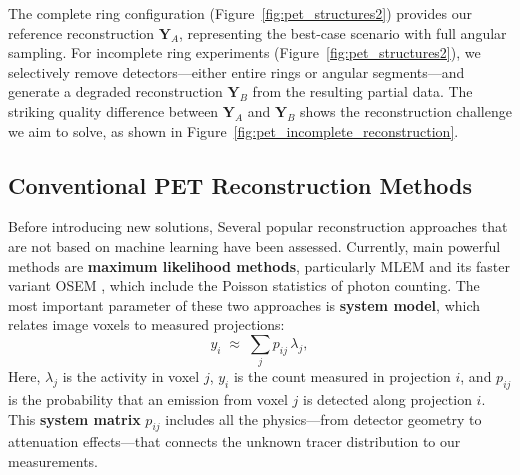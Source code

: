 \documentclass[12pt]{iopart}
\begin{document}
The complete ring configuration (Figure~\ref{fig:pet_structures2}) provides our reference reconstruction $\mathbf{Y}_A$, representing the best-case scenario with full angular sampling. For incomplete ring experiments (Figure~\ref{fig:pet_structures2}), we selectively remove detectors—either entire rings or angular segments—and generate a degraded reconstruction $\mathbf{Y}_B$ from the resulting partial data. The striking quality difference between $\mathbf{Y}_A$ and $\mathbf{Y}_B$ shows the reconstruction challenge we aim to solve, as shown in Figure~\ref{fig:pet_incomplete_reconstruction}.

\subsection{Conventional PET Reconstruction Methods}

Before introducing new solutions, Several popular reconstruction approaches that are not based on machine learning have been assessed.
Currently, main powerful methods are \textbf{maximum likelihood methods}, particularly MLEM and its faster variant OSEM \cite{363108}, which include the Poisson statistics of photon counting. The most important parameter of these two approaches is \textbf{system model}, which relates image voxels to measured projections:
\begin{equation}
    y_i \;\approx\; \sum_{j} p_{ij}\,\lambda_j,
\end{equation}
Here, $\lambda_j$ is the activity in voxel $j$, $y_i$ is the count measured in projection $i$, and $p_{ij}$ is the probability that an emission from voxel $j$ is detected along projection $i$. This \textbf{system matrix} $p_{ij}$ includes all the physics—from detector geometry to attenuation effects—that connects the unknown tracer distribution to our measurements.
\end{document}
